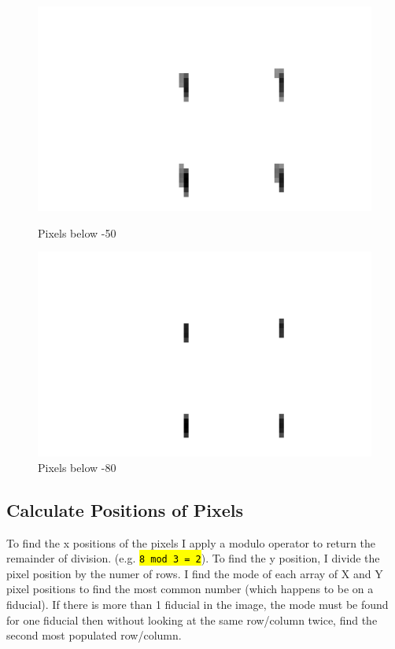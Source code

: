 \documentclass[10pt]{article}
\begin{document}
    \begin{figure}[h]
        \begin{minipage}{0.4\textwidth}
            \begin{center}
                \includegraphics[width=.75\linewidth]{plots_tables_images/below50.png}
                \caption{Pixels below -50}
            \end{center}
        \end{minipage}
        \begin{minipage}{0.4\textwidth}
            \begin{center}
                \includegraphics[width=.75\linewidth]{plots_tables_images/below80.png}
                \caption{Pixels below -80}
            \end{center}
        \end{minipage}
    \end{figure}

    \subsection{Calculate Positions of Pixels} %
    \label{sub:calculate_positions_of_pixels}
    To find the x positions of the pixels I apply a modulo operator to return the remainder of division. (e.g. \hl{\texttt{8 mod 3 = 2}}). To find the y position, I divide the pixel position by the numer of rows. I find the mode of each array of X and Y pixel positions to find the most common number (which happens to be on a fiducial). If there is more than 1 fiducial in the image, the mode must be found for one fiducial then without looking at the same row/column twice, find the second most populated row/column.
\end{document}

